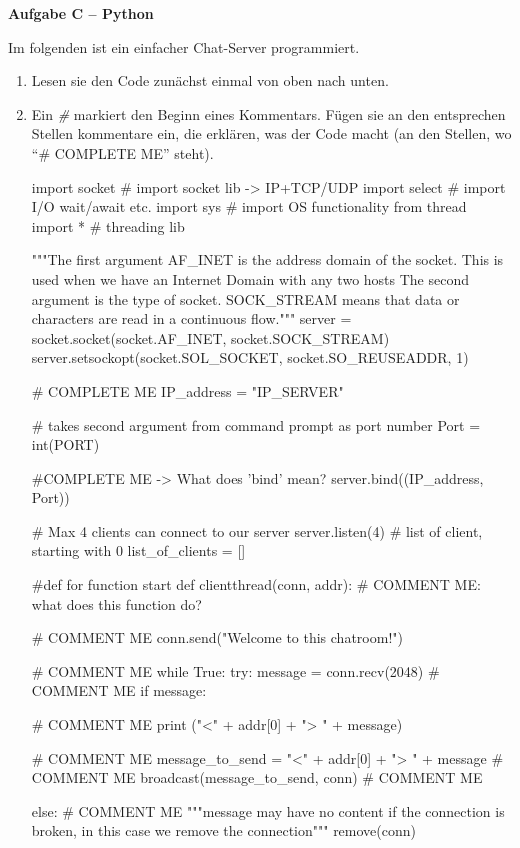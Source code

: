 \documentclass[paper=a4,fontsize=11pt]{scrartcl}%
\numberwithin{equation}{section}
\begin{document}
\begin{center}\Large{\textbf{Aufgabe C -- Python}}\end{center}\vskip0.25in
Im folgenden ist ein einfacher Chat-Server programmiert.
\begin{enumerate}
	\item Lesen sie den Code zunächst einmal von oben nach unten.
	\item Ein \emph{\#} markiert den Beginn eines Kommentars. Fügen sie an den entsprechen Stellen kommentare ein, die erklären, was der Code macht (an den Stellen, wo \enquote{\# COMPLETE ME} steht).
	
	\begin{python}
import socket # import socket lib -> IP+TCP/UDP
import select # import I/O wait/await etc.
import sys # import OS functionality
from thread import * # threading lib
 
"""The first argument AF_INET is the address domain of the
socket. This is used when we have an Internet Domain with
any two hosts The second argument is the type of socket.
SOCK_STREAM means that data or characters are read in
a continuous flow."""
server = socket.socket(socket.AF_INET, socket.SOCK_STREAM)
server.setsockopt(socket.SOL_SOCKET, socket.SO_REUSEADDR, 1)
 
 
# COMPLETE ME
IP_address = "IP_SERVER"
 
# takes second argument from command prompt as port number
Port = int(PORT)

#COMPLETE ME -> What does 'bind' mean?
server.bind((IP_address, Port))
 
# Max 4 clients can connect to our server
server.listen(4)
# list of client, starting with 0 
list_of_clients = []
 
#def for function start 
def clientthread(conn, addr): # COMMENT ME: what does this function do?
 
    # COMMENT ME
    conn.send("Welcome to this chatroom!")
 
 	# COMMENT ME
    while True:
            try:
                message = conn.recv(2048) # COMMENT ME
                if message:
 
                    # COMMENT ME
                    print ("<" + addr[0] + "> " + message)
 
                    # COMMENT ME
                    message_to_send = "<" + addr[0] + "> " + message # COMMENT ME 
                    broadcast(message_to_send, conn) # COMMENT ME
 
                else: # COMMENT ME
                    """message may have no content if the connection
                    is broken, in this case we remove the connection"""
                    remove(conn)
 

\end{python}
\end{enumerate}
\end{document}
